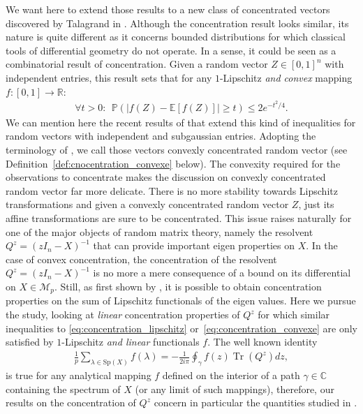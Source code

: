\documentclass{ws-rmta}
\DeclareMathOperator{\tr}{Tr}
\begin{document}
We want here to extend those results to a new class of concentrated vectors discovered by  Talagrand in \cite{TAL95}. Although the concentration result looks similar, its nature is quite different as it concerns bounded distributions for which classical tools of differential geometry do not operate. In a sense, it could be seen as a combinatorial result of concentration.
Given a random vector $Z \in [0,1]^n$ with independent entries, this result sets that for any $1$-Lipschitz \emph{and convex} mapping $f: [0,1] \to \mathbb R$:
\begin{align}\label{eq:concentration_convexe}
  \forall t >0: \ \ \mathbb P \left( \left\vert f(Z) - \mathbb E[f(Z)] \right\vert \geq t \right) \leq 2 e^{-t^2/4}.
\end{align}
We can mention here the recent results of \cite{Hua21} that extend this kind of inequalities for random vectors with independent and subgaussian entries.
Adopting the terminology of \cite{VU2014,MEC11,ADA11}, we call those vectors convexly concentrated random vector (see Definition~\ref{def:cnocentration_convexe} below).
The convexity required for the observations to concentrate makes the discussion on convexly concentrated random vector far more delicate. There is no more stability towards Lipschitz transformations and given a convexly concentrated random vector $Z$, just its affine transformations are sure to be concentrated. 
This issue raises naturally for one of the major objects of random matrix theory, namely the resolvent $Q^z = (zI_n - X)^{-1}$ that can provide important eigen properties on $X$. %
In the case of convex concentration, the concentration of the resolvent $Q^z = (zI_n - X)^{-1}$ is no more a mere consequence of a bound on its differential on $X\in \mathcal{M}_{p}$. Still, as first shown by \cite{Gui00}, it is possible to obtain concentration properties on the sum of Lipschitz functionals of the eigen values. Here we pursue the study, looking at \textit{linear} concentration properties of $Q^z$ for which similar inequalities to \eqref{eq:concentration_lipschitz} or~\eqref{eq:concentration_convexe} are only satisfied by $1$-Lipschitz \emph{and linear} functionals $f$. 
The well known identity
\begin{align}\label{eq:importance_stieltjes_transform}
  \frac{1}{p}\sum_{\lambda \in \text{Sp}(X)} f(\lambda) = - \frac{1}{2i\pi} \oint_\gamma f(z) \tr(Q^z)dz,
\end{align}
is true for any analytical mapping $f$ defined on the interior of a path $\gamma \in \mathbb C$ containing the spectrum of $X$ (or any limit of such mappings), therefore, our results on the concentration of $Q^z$ concern in particular the quantities studied in \cite{Gui00}.
\end{document}
